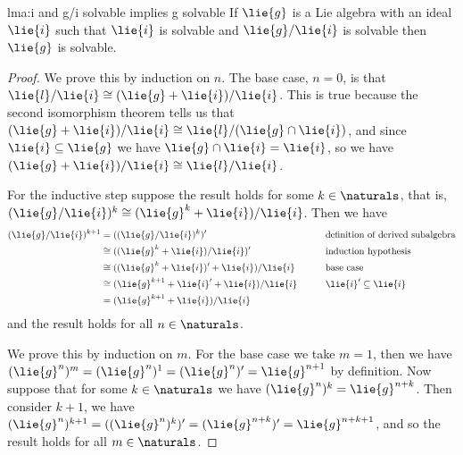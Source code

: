 \documentclass[fleqn]{NotesClass}
\newcommand{\isomorphic}{\cong}
\begin{document}
    \begin{lma}{}{lma:i and g/i solvable implies g solvable}
        If \(\lie{g}\) is a Lie algebra with an ideal \(\lie{i}\) such that \(\lie{i}\) is solvable and \(\lie{g}/\lie{i}\) is solvable then \(\lie{g}\) is solvable.
        \begin{proof}
            \Step{\((\lie{g}/\lie{i})^n \isomorphic (\lie{g}^n + \lie{i})/\lie{i}\)}
            We prove this by induction on \(n\).
            The base case, \(n = 0\), is that \(\lie{l}/\lie{i} \isomorphic (\lie{g} + \lie{i})/\lie{i}\).
            This is true because the second isomorphism theorem tells us that \((\lie{g} + \lie{i})/\lie{i} \isomorphic \lie{l}/(\lie{g} \cap \lie{i})\), and since \(\lie{i} \subseteq \lie{g}\) we have \(\lie{g} \cap \lie{i} = \lie{i}\), so we have \((\lie{g} + \lie{i})/\lie{i} \isomorphic \lie{l}/\lie{i}\).
            
            For the inductive step suppose the result holds for some \(k \in \naturals\), that is, \((\lie{g}/\lie{i})^k \isomorphic (\lie{g}^k + \lie{i})/\lie{i}\).
            Then we have
            \begin{alignat}{2}
                (\lie{g}/\lie{i})^{k + 1} &= ((\lie{g}/\lie{i})^k)' \qquad && \text{definition of derived subalgebra} \notag\\
                &\isomorphic ((\lie{g}^k + \lie{i})/\lie{i})' \qquad && \text{induction hypothesis}\\
                &\isomorphic ((\lie{g}^k + \lie{i})' + \lie{i})/\lie{i} \qquad && \text{base case}\\
                &\isomorphic (\lie{g}^{k + 1} + \lie{i}' + \lie{i})/\lie{i} \qquad && \lie{i}' \subseteq \lie{i}\\
                &= (\lie{g}^{k + 1} + \lie{i})/\lie{i}
            \end{alignat}
            and the result holds for all \(n \in \naturals\).
            
            We prove this by induction on \(m\).
            For the base case we take \(m = 1\), then we have \((\lie{g}^n)^m = (\lie{g}^n)^1 = (\lie{g}^n)' = \lie{g}^{n+1}\) by definition.
            Now suppose that for some \(k \in \naturals\) we have \((\lie{g}^n)^k = \lie{g}^{n + k}\).
            Then consider \(k + 1\), we have \((\lie{g}^n)^{k + 1} = ((\lie{g}^n)^k)' = (\lie{g}^{n + k})' = \lie{g}^{n + k + 1}\), and so the result holds for all \(m \in \naturals\).
            

\end{proof}
\end{lma}
\end{document}
